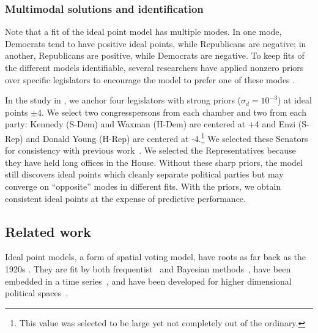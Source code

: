 

\subsubsection*{Multimodal solutions and identification}
Note that a fit of the ideal point model has multiple modes.  In one
mode, Democrats tend to have positive ideal points, while Republicans
are negative; in another, Republicans are positive, while Democrats
are negative.  To keep fits of the different models identifiable,
several researchers have applied nonzero priors over specific
legislators to encourage the model to prefer one of these modes
\cite{jackman:2001,clinton:2004,martin:2002}.

In the study in , we anchor four legislators with
strong priors ($\sigma_d = 10^{-3}$) at ideal points $\pm 4$.  We
select two congresspersons from each chamber and two from each party:
Kennedy (S-Dem) and Waxman (H-Dem) are centered at +4 and Enzi (S-Rep)
and Donald Young (H-Rep) are centered at -4.\footnote{This value was
selected to be large yet not completely out of the ordinary.} We
selected these Senators for consistency with previous
work~\cite{clinton:2004}.  We selected the Representatives because
they have held long offices in the House.  Without these sharp priors,
the model still discovers ideal points which cleanly separate
political parties but may converge on ``opposite'' modes in different
fits.  With the priors, we obtain consistent ideal points at the
expense of predictive performance.

\subsection*{Related work}


Ideal point models, a form of spatial voting model, have roots as far
back as the 1920s \cite{enelow:1984}. They are fit by both
frequentist~\cite{poole:1985,heckman:1996} and Bayesian
methods~\cite{jackman:2001,martin:2002,clinton:2004}, have been
embedded in a time series~\cite{martin:2002,wang:2010}, and have been
developed for higher dimensional political
spaces~\cite{jackman:2001,heckman:1996}.


